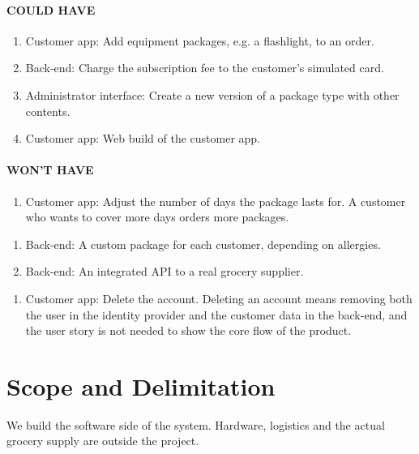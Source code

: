 \documentclass[a4paper,11pt]{article}
\begin{document}
\paragraph{COULD HAVE}
\begin{enumerate}[label=\reqlabel{FR}, start=13]
    \item Customer app: Add equipment packages, e.g. a flashlight, to an order.
    \item Back-end: Charge the subscription fee to the customer's simulated card.
    \item Administrator interface: Create a new version of a package type with other contents.
    \item Customer app: Web build of the customer app.
\end{enumerate}

\paragraph{WON'T HAVE}
\begin{enumerate}[label=\reqlabel{FR}, start=12]
    \item Customer app: Adjust the number of days the package lasts for. A customer who wants to cover more days orders more packages.
\end{enumerate}
\begin{enumerate}[label=\reqlabel{FR}, start=17]
    \item Back-end: A custom package for each customer, depending on allergies.
    \item Back-end: An integrated API to a real grocery supplier.
\end{enumerate}
\begin{enumerate}[label=\reqlabel{FR}, start=21]
    \item Customer app: Delete the account. Deleting an account means removing both the user in the identity provider and the customer data in the back-end, and the user story is not needed to show the core flow of the product.
\end{enumerate}

\section{Scope and Delimitation}
We build the software side of the system. Hardware, logistics and the actual grocery supply are outside the project.
\end{document}
